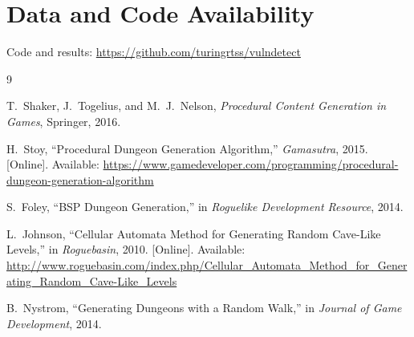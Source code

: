 \documentclass[11pt,a4paper]{article}
\begin{document}
\section*{Data and Code Availability}

Code and results: \url{https://github.com/turingrtss/vulndetect}

\begin{thebibliography}{9}

T.~Shaker, J.~Togelius, and M.~J.~Nelson, \textit{Procedural Content Generation in Games}, Springer, 2016.

H.~Stoy, ``Procedural Dungeon Generation Algorithm,'' \textit{Gamasutra}, 2015. [Online]. Available: \url{https://www.gamedeveloper.com/programming/procedural-dungeon-generation-algorithm}

S.~Foley, ``BSP Dungeon Generation,'' in \textit{Roguelike Development Resource}, 2014.

L.~Johnson, ``Cellular Automata Method for Generating Random Cave-Like Levels,'' in \textit{Roguebasin}, 2010. [Online]. Available: \url{http://www.roguebasin.com/index.php/Cellular_Automata_Method_for_Generating_Random_Cave-Like_Levels}

B.~Nystrom, ``Generating Dungeons with a Random Walk,'' in \textit{Journal of Game Development}, 2014.

\end{thebibliography}
\end{document}
